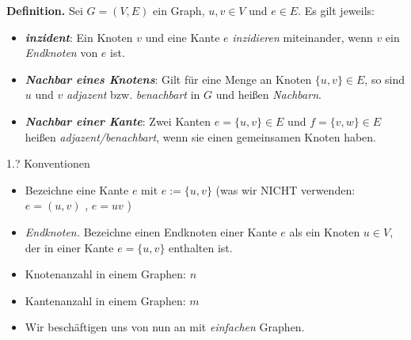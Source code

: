 \documentclass{beamer}
\begin{document}
\begin{frame}
    \textbf{Definition.}
    Sei \(G = (V, E)\) ein Graph, \(u, v \in V\) und \(e \in E\). 
    Es gilt jeweils:
    \begin{itemize}
        \item \textbf{\textit{inzident}}: 
            Ein Knoten \(v\) und eine Kante \(e\) \textit{inzidieren} miteinander, wenn \(v\) ein \textit{Endknoten} von \(e\) ist.
        \item \textbf{\textit{Nachbar eines Knotens}}:
            Gilt für eine Menge an Knoten \(\{u, v\} \in E\), so sind \(u\) und \(v\) \textit{adjazent} bzw. \textit{benachbart} in \(G\) und heißen \textit{Nachbarn}. 
        \item \textbf{\textit{Nachbar einer Kante}}:
            Zwei Kanten \(e = \{u, v\} \in E\) und \(f = \{v, w\} \in E\) heißen \textit{adjazent/benachbart}, wenn sie einen gemeinsamen Knoten haben.
    \end{itemize}
\end{frame}

\begin{frame}{1.? Konventionen}
    \begin{itemize}
        \item Bezeichne eine Kante \(e\) mit \(e:= \{u, v\}\) (was wir NICHT verwenden: \(e = (u, v)\) , \(e = uv\) )
        \item \textit{Endknoten.} Bezeichne einen Endknoten einer Kante \(e\) als ein Knoten \(u \in V\), der in einer Kante \(e = \{u, v\}\) enthalten ist. %
        \item Knotenanzahl in einem Graphen: \(n\)
        \item Kantenanzahl in einem Graphen: \(m\)
        \item Wir beschäftigen uns von nun an mit \textit{einfachen} Graphen.
    \end{itemize}
\end{frame}
\end{document}
